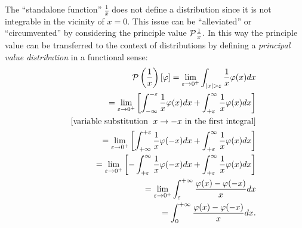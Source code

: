 The ``standalone function'' $\frac{1}{x}$
does not define a distribution  since it is not integrable in
the vicinity of $x=0$.
This issue can be ``alleviated'' or ``circumvented''  by considering the principle value  ${\cal P}\frac{1}{x}$.
In this way the
principle value can be transferred to the context of distributions
by defining
a {\em principal value distribution} in a functional sense:
\begin{equation}
\begin{split}
{\cal P} \left(\frac{1}{x}\right) \left[\varphi\right]
=
\lim_{\varepsilon \rightarrow 0^+}
\int_{ \vert x \vert > \varepsilon }   \frac{1}{x}\varphi(x) dx
\\
\qquad
= \lim_{\varepsilon \rightarrow 0^+}
\left[
\int_{-\infty}^{ -\varepsilon} \frac{1}{x}\varphi(x) dx
+
\int_{ +\varepsilon}^{\infty} \frac{1}{x}\varphi(x) dx
\right]
\\
\qquad
[\textrm{variable substitution } \; x\rightarrow -x \textrm{ in the first integral}]
\\
\qquad
= \lim_{\varepsilon \rightarrow 0^+}
\left[
\int_{+\infty}^{ +\varepsilon} \frac{1}{x}\varphi(-x) dx
+
\int_{ +\varepsilon}^{\infty} \frac{1}{x}\varphi(x) dx
\right]
\\
\qquad
= \lim_{\varepsilon \rightarrow 0^+}
\left[
-\int_{ +\varepsilon}^{\infty} \frac{1}{x}\varphi(-x) dx
+
\int_{ +\varepsilon}^{\infty} \frac{1}{x}\varphi(x) dx
\right]
\\
\qquad
=
\lim_{\varepsilon \rightarrow 0^+}
\int_{\varepsilon}^{+\infty}   \frac{\varphi(x)-\varphi(-x)}{x} dx
\\
\qquad
=
\int_{0}^{+\infty}   \frac{\varphi(x)-\varphi(-x)}{x} dx
.
\end{split}
\label{2012-m-ch-di-prinvaldi}
\end{equation}



